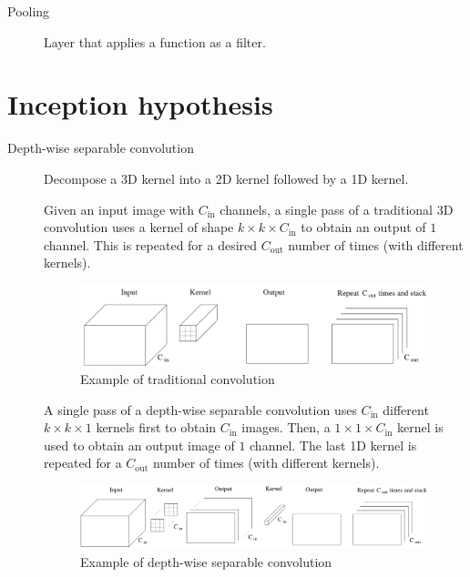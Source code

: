 \begin{description}
    \item[Pooling]
        Layer that applies a function as a filter.

\end{description}



\section{Inception hypothesis}

\begin{description}
    \item[Depth-wise separable convolution] 
        Decompose a 3D kernel into a 2D kernel followed by a 1D kernel.

        Given an input image with $C_\text{in}$ channels, 
        a single pass of a traditional 3D convolution uses a kernel of shape $k \times k \times C_\text{in}$
        to obtain an output of $1$ channel. 
        This is repeated for a desired $C_\text{out}$ number of times (with different kernels).
        \begin{figure}[H]
            \centering
            \includegraphics[width=0.65\linewidth]{./img/traditional_convolution.png}
            \caption{Example of traditional convolution}
        \end{figure}

        A single pass of a depth-wise separable convolution uses $C_\text{in}$ different $k \times k \times 1$ kernels first to obtain $C_\text{in}$ images.
        Then, a $1 \times 1 \times C_\text{in}$ kernel is used to obtain an output image of $1$ channel. 
        The last 1D kernel is repeated for a $C_\text{out}$ number of times (with different kernels).
        \begin{figure}[H]
            \centering
            \includegraphics[width=0.85\linewidth]{./img/depthwise_separable_convolution.png}
            \caption{Example of depth-wise separable convolution}
        \end{figure}
\end{description}


